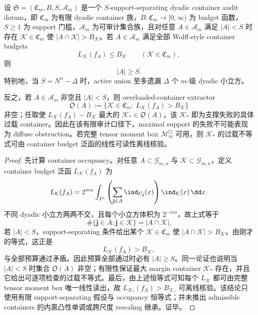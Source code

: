 \begin{theorem}\label{distill:wang_zahl-convex_container_non_concentration_implies_maximal_support-spg-budget-forces-support}
设 \(\mathfrak S=(\mathfrak C_m,B,S,\mathscr A_m)\) 是一个 \(S\)-support-separating dyadic container audit datum，即 \(\mathfrak C_m\) 为有限 dyadic container 族，\(B:\mathfrak C_m\to[0,\infty)\) 为 budget 函数，\(S\ge 1\) 为 support 门槛，\(\mathscr A_m\) 为可审计集合族，且对任意 \(A\in\mathscr A_m\) 满足 \(|A|<S\) 时存在 \(\mathcal K\in\mathfrak C_m\) 使 \(|A\cap\mathcal K|>B_{\mathcal K}\)。若 \(A\in\mathscr A_m\) 满足全部 Wolff-style container budgets
\[
L_{\mathcal K}(f_A)\le B_{\mathcal K}\qquad(\mathcal K\in\mathfrak C_m),
\]
则
\[
|A|\ge S.
\]
特别地，当 \(S=N^n-\Delta\) 时，active union 至多遗漏 \(\Delta\) 个 \(m\)-级 dyadic 小立方。

反之，若 \(A\in\mathscr A_m\) 非空且 \(|A|<S\)，则 overloaded-container extractor
\[
\mathfrak O(A):=\{\mathcal K\in\mathfrak C_m:\ L_{\mathcal K}(f_A)>B_{\mathcal K}\}
\]
非空；任取使 \(L_{\mathcal K}(f_A)-B_{\mathcal K}\) 最大的 \(\mathcal K_\ast\in\mathfrak O(A)\)，该 \(\mathcal K_\ast\) 即为支撑失败的具体过载 container。因此在该有限审计口径下，maximal support 的失败不可能表现为 diffuse obstruction。若完整 tensor moment box \(\mathcal M_m^{\Box}\) 可用，则 \(\mathcal K_\ast\) 的过载不等式可由 container budget 泛函的线性可读性离线核验。
\end{theorem}
\begin{proof}
先计算 container occupancy。对任意 \(A\subset\mathcal G_{m,n}\) 与 \(\mathcal K\subset\mathcal G_{m,n}\)，定义 container budget 泛函
\(L_{\mathcal K}(f_A)\) 为
\[
L_{\mathcal K}(f_A)
=2^{mn}\int_{I^n}\left(\sum_{\mathbf j\in A}\ind_{C_{\mathbf j}}(x)\right)\ind_{\mathcal K}(x)\,\dd x.
\]
不同 dyadic 小立方两两不交，且每个小立方体积为 \(2^{-mn}\)，故上式等于
\[
\#\{\mathbf j\in A:\mathbf j\in\mathcal K\}=|A\cap\mathcal K|.
\]
若 \(|A|<S\)，support-separating 条件给出某个 \(\mathcal K\in\mathfrak C_m\) 使 \(|A\cap\mathcal K|>B_{\mathcal K}\)。由刚才的等式，这正是
\[
L_{\mathcal K}(f_A)>B_{\mathcal K},
\]
与全部预算通过矛盾。因此预算全部通过时必有 \(|A|\ge S\)。同一论证也说明当 \(|A|<S\) 时集合 \(\mathfrak O(A)\) 非空；有限性保证最大 margin container \(\mathcal K_\ast\) 存在，并且它给出可逐项检查的过载不等式。最后，由上述恒等式可知每个 \(L_{\mathcal K}\) 都可由完整 tensor moment box 唯一线性读出，故 \(L_{\mathcal K_\ast}(f_A)>B_{\mathcal K_\ast}\) 可离线核验。该结论只使用有限 support-separating 假设与 occupancy 恒等式；并未推出 admissible containers 的内禀凸性单调或跨尺度 rescaling 继承。证毕。
\end{proof}

